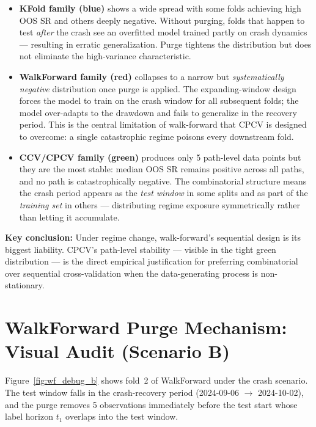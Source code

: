 \documentclass[11pt,a4paper]{article}
\begin{document}
\begin{itemize}
  \item \textbf{KFold family (blue)} shows a wide spread with some folds
    achieving high OOS SR and others deeply negative.  Without purging, folds
    that happen to test \emph{after} the crash see an overfitted model trained
    partly on crash dynamics --- resulting in erratic generalization.  Purge
    tightens the distribution but does not eliminate the high-variance
    characteristic.

  \item \textbf{WalkForward family (red)} collapses to a narrow but
    \emph{systematically negative} distribution once purge is applied.  The
    expanding-window design forces the model to train on the crash window for
    all subsequent folds; the model over-adapts to the drawdown and fails to
    generalize in the recovery period.  This is the central limitation of
    walk-forward that CPCV is designed to overcome: a single catastrophic
    regime poisons every downstream fold.

  \item \textbf{CCV/CPCV family (green)} produces only 5 path-level data points
    but they are the most stable: median OOS SR remains positive across all
    paths, and no path is catastrophically negative.  The combinatorial
    structure means the crash period appears as the \emph{test window} in some
    splits and as part of the \emph{training set} in others --- distributing
    regime exposure symmetrically rather than letting it accumulate.
\end{itemize}

\textbf{Key conclusion:} Under regime change, walk-forward's sequential design
is its biggest liability.  CPCV's path-level stability --- visible in the tight
green distribution --- is the direct empirical justification for preferring
combinatorial over sequential cross-validation when the data-generating process
is non-stationary.

\section{WalkForward Purge Mechanism: Visual Audit (Scenario B)}

Figure~\ref{fig:wf_debug_b} shows fold~2 of WalkForward under the crash
scenario.  The test window falls in the crash-recovery period
(2024-09-06 $\to$ 2024-10-02), and the purge removes 5 observations
immediately before the test start whose label horizon $t_1$ overlaps into
the test window.
\end{document}
